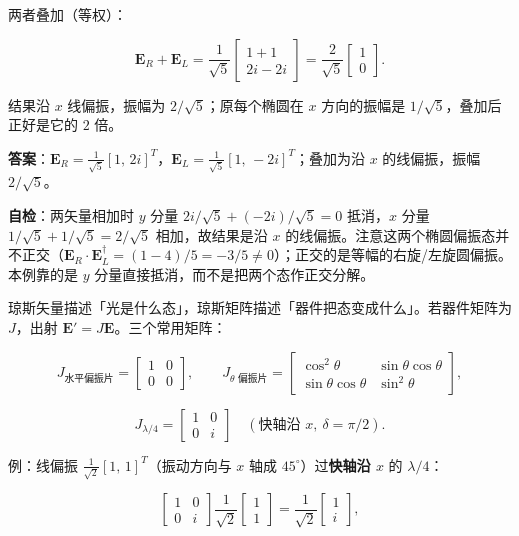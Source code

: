 \documentclass[11pt]{ctexart}
\begin{document}
两者叠加（等权）：

\[
\mathbf{E}_R+\mathbf{E}_L
=\frac{1}{\sqrt5}\begin{bmatrix}1+1\\ 2i-2i\end{bmatrix}
=\frac{2}{\sqrt5}\begin{bmatrix}1\\0\end{bmatrix}.
\]

结果沿 $x$ 线偏振，振幅为 $2/\sqrt5$；原每个椭圆在 $x$ 方向的振幅是 $1/\sqrt5$，叠加后正好是它的 $2$ 倍。

\textbf{答案}：$\mathbf{E}_R=\frac{1}{\sqrt5}[1,\,2i]^{T}$，$\mathbf{E}_L=\frac{1}{\sqrt5}[1,\,-2i]^{T}$；叠加为沿 $x$ 的线偏振，振幅 $2/\sqrt5$。

\textbf{自检}：两矢量相加时 $y$ 分量 $2i/\sqrt5+(-2i)/\sqrt5=0$ 抵消，$x$ 分量 $1/\sqrt5+1/\sqrt5=2/\sqrt5$ 相加，故结果是沿 $x$ 的线偏振。注意这两个椭圆偏振态并不正交（$\mathbf{E}_R\cdot\mathbf{E}_L^\dagger=(1-4)/5=-3/5\neq0$）；正交的是等幅的右旋/左旋圆偏振。本例靠的是 $y$ 分量直接抵消，而不是把两个态作正交分解。



琼斯矢量描述「光是什么态」，琼斯矩阵描述「器件把态变成什么」。若器件矩阵为 $J$，出射 $\mathbf{E}'=J\mathbf{E}$。三个常用矩阵：

\[
J_{\text{水平偏振片}}=\begin{bmatrix}1&0\\0&0\end{bmatrix},\qquad
J_{\theta\text{ 偏振片}}=\begin{bmatrix}\cos^2\theta&\sin\theta\cos\theta\\
\sin\theta\cos\theta&\sin^2\theta\end{bmatrix},
\]

\[
J_{\lambda/4}=\begin{bmatrix}1&0\\0&i\end{bmatrix}
\quad(\text{快轴沿 }x,\ \delta=\pi/2).
\]

例：线偏振 $\frac{1}{\sqrt2}[1,\,1]^{T}$（振动方向与 $x$ 轴成 $45^\circ$）过\textbf{快轴沿 $x$} 的 $\lambda/4$：

\[
\begin{bmatrix}1&0\\0&i\end{bmatrix}
\frac{1}{\sqrt2}\begin{bmatrix}1\\1\end{bmatrix}
=\frac{1}{\sqrt2}\begin{bmatrix}1\\ i\end{bmatrix},
\]
\end{document}
